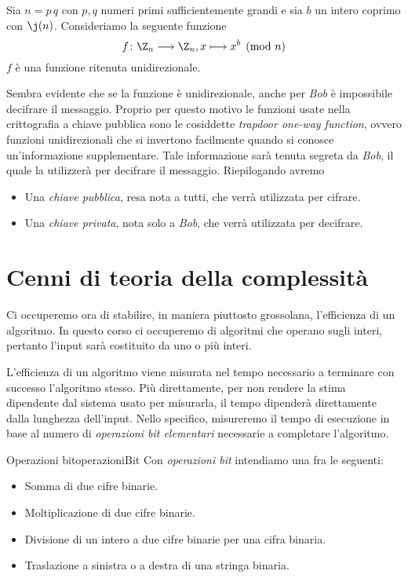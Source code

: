 	\begin{ese}
	Sia \(n=p\,q\) con \(p,q\) numeri primi sufficientemente grandi e sia \(b\) un intero coprimo con \(\j(n)\). Consideriamo la seguente funzione
		\[
		f\colon \Z_n \longrightarrow \Z_n, x \longmapsto x^b \pmod{n}
		\]
	\(f\) è una funzione ritenuta unidirezionale.
	\end{ese}

	Sembra evidente che se la funzione è unidirezionale, anche per \emph{Bob} è impossibile decifrare il messaggio.
	Proprio per questo motivo le funzioni usate nella crittografia a chiave pubblica sono le cosiddette \emph{trapdoor one-way function}, ovvero funzioni unidirezionali che si invertono facilmente quando si conosce un'informazione supplementare.
	Tale informazione sarà tenuta segreta da \emph{Bob}, il quale la utilizzerà per decifrare il messaggio.
	Riepilogando avremo
	\begin{itemize}
		\item Una \emph{chiave pubblica}, resa nota a tutti, che verrà utilizzata per cifrare.
		\item Una \emph{chiave privata}, nota solo a \emph{Bob}, che verrà utilizzata per decifrare.
	\end{itemize}

\section{Cenni di teoria della complessità}

	Ci occuperemo ora di stabilire, in maniera piuttosto grossolana, l'efficienza di un algoritmo.
	In questo corso ci occuperemo di algoritmi che operano sugli interi, pertanto l'input sarà costituito da uno o più interi.

	L'efficienza di un algoritmo viene misurata nel tempo necessario a terminare con successo l'algoritmo stesso.
	Più direttamente, per non rendere la stima dipendente dal sistema usato per misurarla, il tempo dipenderà direttamente dalla lunghezza dell'input.
	Nello specifico, misureremo il tempo di esecuzione in base al numero di \emph{operazioni bit elementari} necessarie a completare l'algoritmo.

	\begin{defn}{Operazioni bit}{operazioniBit}
	Con \emph{operazioni bit} intendiamo una fra le seguenti:
	\begin{itemize}
		\item Somma di due cifre binarie.
		\item Moltiplicazione di due cifre binarie.
		\item Divisione di un intero a due cifre binarie per una cifra binaria.
		\item Traslazione a sinistra o a destra di una stringa binaria.
	\end{itemize}
	\end{defn}

